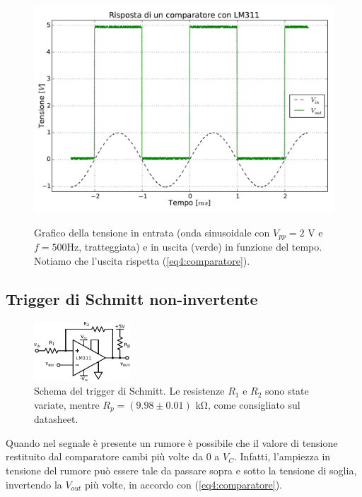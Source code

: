 \begin{figure}[ht]
 \centering
   {\includegraphics[width=14.5cm]{../E04/latex/comp.pdf}}
 \caption{Grafico della tensione in entrata (onda sinusoidale con $V_{pp}=2$ \si{\volt} e $f=500$\si{\hertz}, tratteggiata) e in uscita (verde) in funzione del tempo. Notiamo che l'uscita rispetta (\ref{eq4:comparatore}).}
 \label{gr4:comparatore}
\end{figure}

\newpage

\subsection{Trigger di Schmitt non-invertente}

\begin{figure}
  \begin{center}
    \includegraphics[width=0.320\textwidth]{../E04/latex/c_schmitt.pdf}
  \end{center}
  \caption{Schema del trigger di Schmitt. Le resistenze $R_1$ e $R_2$ sono state variate, mentre $R_p=(9.98 \pm 0.01)$ \si{\kilo\ohm}, come consigliato sul datasheet.}
  \label{cir4:schmitt}
\end{figure}

Quando nel segnale è presente un rumore è possibile che il valore di tensione restituito dal comparatore cambi più volte da $0$ a $V_{C}$.
Infatti, l'ampiezza in tensione del rumore può essere tale da passare sopra e sotto la tensione di soglia, invertendo la $V_{out}$ più volte, in accordo con (\ref{eq4:comparatore}).


